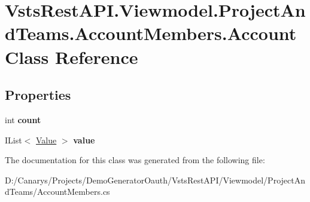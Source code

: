 \hypertarget{class_vsts_rest_a_p_i_1_1_viewmodel_1_1_project_and_teams_1_1_account_members_1_1_account}{}\section{Vsts\+Rest\+A\+P\+I.\+Viewmodel.\+Project\+And\+Teams.\+Account\+Members.\+Account Class Reference}
\label{class_vsts_rest_a_p_i_1_1_viewmodel_1_1_project_and_teams_1_1_account_members_1_1_account}
\subsection*{Properties}
\begin{DoxyCompactItemize}
\item 
\mbox{\label{class_vsts_rest_a_p_i_1_1_viewmodel_1_1_project_and_teams_1_1_account_members_1_1_account_a4d7117986f891ea51391e42b5f76216d}} 
int {\bfseries count}
\item 
\mbox{\label{class_vsts_rest_a_p_i_1_1_viewmodel_1_1_project_and_teams_1_1_account_members_1_1_account_ad21109183f9784899def1e6d88991f77}} 
I\+List$<$ \mbox{\hyperlink{class_vsts_rest_a_p_i_1_1_viewmodel_1_1_project_and_teams_1_1_account_members_1_1_value}{Value}} $>$ {\bfseries value}
\end{DoxyCompactItemize}


The documentation for this class was generated from the following file\+:\begin{DoxyCompactItemize}
\item 
D\+:/\+Canarys/\+Projects/\+Demo\+Generator\+Oauth/\+Vsts\+Rest\+A\+P\+I/\+Viewmodel/\+Project\+And\+Teams/Account\+Members.\+cs\end{DoxyCompactItemize}
